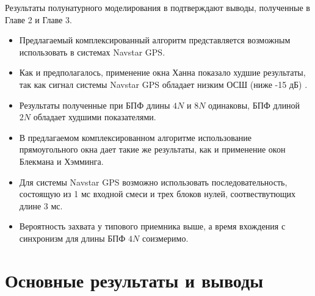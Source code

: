 Результаты полунатурного моделирования в подтверждают выводы, полученные в Главе 2 и Главе 3.

\begin{itemize}
\item Предлагаемый комплексированный алгоритм представляется возможным использовать в системах Navstar GPS.
\item Как и предполагалось, применение окна Ханна показало худшие результаты, так как сигнал системы Navstar GPS обладает низким ОСШ (ниже -15 дБ) .
\item Результаты полученные при БПФ длины ${4N}$ и ${8N}$ одинаковы, БПФ длиной ${2N}$ обладает худшими показателями.
\item В предлагаемом комплексированном алгоритме использование прямоугольного окна дает такие же результаты, как и применение окон Блекмана и Хэмминга.
\item Для системы Navstar GPS возможно использовать последовательность, состоящую из 1 мс входной смеси и трех блоков нулей, соотвествутющих длине 3 мс.
\item Вероятность захвата у типового приемника выше, а время вхождения с синхронизм для длины БПФ ${4N}$ соизмеримо.
\end{itemize}

\clearpage

\chapter*{Основные результаты и выводы}

